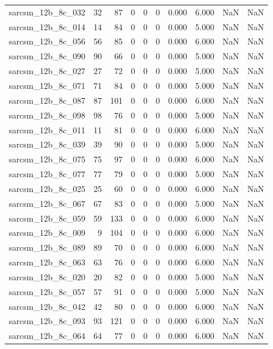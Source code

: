 \documentclass{article}
\begin{document}
\begin{longtable}{lrrrrrrrrr}
sarcsm\_12b\_8c\_032 & 32 & 87 & 0 & 0 & 0 & 0.000 & 6.000 & NaN & NaN \\
sarcsm\_12b\_8c\_014 & 14 & 84 & 0 & 0 & 0 & 0.000 & 5.000 & NaN & NaN \\
sarcsm\_12b\_8c\_056 & 56 & 85 & 0 & 0 & 0 & 0.000 & 6.000 & NaN & NaN \\
sarcsm\_12b\_8c\_090 & 90 & 66 & 0 & 0 & 0 & 0.000 & 5.000 & NaN & NaN \\
sarcsm\_12b\_8c\_027 & 27 & 72 & 0 & 0 & 0 & 0.000 & 5.000 & NaN & NaN \\
sarcsm\_12b\_8c\_071 & 71 & 84 & 0 & 0 & 0 & 0.000 & 5.000 & NaN & NaN \\
sarcsm\_12b\_8c\_087 & 87 & 101 & 0 & 0 & 0 & 0.000 & 6.000 & NaN & NaN \\
sarcsm\_12b\_8c\_098 & 98 & 76 & 0 & 0 & 0 & 0.000 & 5.000 & NaN & NaN \\
sarcsm\_12b\_8c\_011 & 11 & 81 & 0 & 0 & 0 & 0.000 & 6.000 & NaN & NaN \\
sarcsm\_12b\_8c\_039 & 39 & 90 & 0 & 0 & 0 & 0.000 & 5.000 & NaN & NaN \\
sarcsm\_12b\_8c\_075 & 75 & 97 & 0 & 0 & 0 & 0.000 & 6.000 & NaN & NaN \\
sarcsm\_12b\_8c\_077 & 77 & 79 & 0 & 0 & 0 & 0.000 & 5.000 & NaN & NaN \\
sarcsm\_12b\_8c\_025 & 25 & 60 & 0 & 0 & 0 & 0.000 & 6.000 & NaN & NaN \\
sarcsm\_12b\_8c\_067 & 67 & 83 & 0 & 0 & 0 & 0.000 & 5.000 & NaN & NaN \\
sarcsm\_12b\_8c\_059 & 59 & 133 & 0 & 0 & 0 & 0.000 & 6.000 & NaN & NaN \\
sarcsm\_12b\_8c\_009 & 9 & 104 & 0 & 0 & 0 & 0.000 & 6.000 & NaN & NaN \\
sarcsm\_12b\_8c\_089 & 89 & 70 & 0 & 0 & 0 & 0.000 & 6.000 & NaN & NaN \\
sarcsm\_12b\_8c\_063 & 63 & 76 & 0 & 0 & 0 & 0.000 & 6.000 & NaN & NaN \\
sarcsm\_12b\_8c\_020 & 20 & 82 & 0 & 0 & 0 & 0.000 & 5.000 & NaN & NaN \\
sarcsm\_12b\_8c\_057 & 57 & 91 & 0 & 0 & 0 & 0.000 & 5.000 & NaN & NaN \\
sarcsm\_12b\_8c\_042 & 42 & 80 & 0 & 0 & 0 & 0.000 & 6.000 & NaN & NaN \\
sarcsm\_12b\_8c\_093 & 93 & 121 & 0 & 0 & 0 & 0.000 & 6.000 & NaN & NaN \\
sarcsm\_12b\_8c\_064 & 64 & 77 & 0 & 0 & 0 & 0.000 & 6.000 & NaN & NaN \\

\end{longtable}
\end{document}
